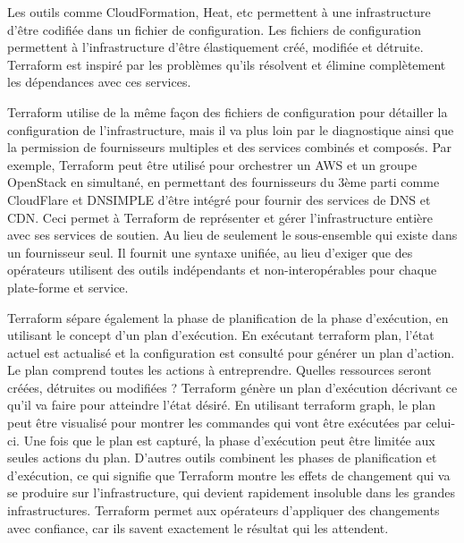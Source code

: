 \documentclass[]{article}
\begin{document}
Les outils comme CloudFormation, Heat, etc permettent à une
infrastructure d'être codifiée dans un fichier de configuration. Les
fichiers de configuration permettent à l'infrastructure d'être
élastiquement créé, modifiée et détruite. Terraform est inspiré par les
problèmes qu'ils résolvent et élimine complètement les dépendances avec ces services.

Terraform utilise de la même façon des fichiers de configuration pour
détailler la configuration de l'infrastructure, mais il va plus loin par
le diagnostique ainsi que la permission de fournisseurs multiples et des
services combinés et composés. Par exemple, Terraform peut être utilisé
pour orchestrer un AWS et un groupe OpenStack en simultané, en
permettant des fournisseurs du 3ème parti comme CloudFlare et DNSIMPLE
d'être intégré pour fournir des services de DNS et CDN. Ceci permet à
Terraform de représenter et gérer l'infrastructure entière avec ses
services de soutien. Au lieu de seulement le sous-ensemble qui existe
dans un fournisseur seul. Il fournit une syntaxe unifiée, au lieu
d'exiger que des opérateurs utilisent des outils indépendants et
non-interopérables pour chaque plate-forme et service.

Terraform sépare également la phase de planification de la phase
d'exécution, en utilisant le concept d'un plan d'exécution. En exécutant
terraform plan, l'état actuel est actualisé et la configuration est
consulté pour générer un plan d'action. Le plan comprend toutes les
actions à entreprendre. Quelles ressources seront créées, détruites ou
modifiées ? Terraform génère un plan d'exécution décrivant ce qu'il va
faire pour atteindre l'état désiré. En utilisant terraform graph, le
plan peut être visualisé pour montrer les commandes qui vont être
exécutées par celui-ci. Une fois que le plan est capturé, la phase
d'exécution peut être limitée aux seules actions du plan. D'autres
outils combinent les phases de planification et d'exécution, ce qui
signifie que Terraform montre les effets de changement qui va se
produire sur l'infrastructure, qui devient rapidement insoluble dans les
grandes infrastructures. Terraform permet aux opérateurs d'appliquer des
changements avec confiance, car ils savent exactement le résultat qui les attendent.
\end{document}
